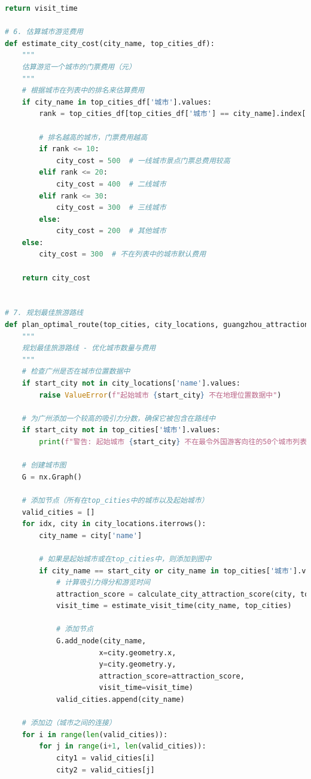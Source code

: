 \documentclass[withoutpreface,bwprint]{cumcmthesis} %
\begin{document}
\begin{appendices}
\begin{lstlisting}[language=python]
    return visit_time

# 6. 估算城市游览费用
def estimate_city_cost(city_name, top_cities_df):
    """
    估算游览一个城市的门票费用（元）
    """
    # 根据城市在列表中的排名来估算费用
    if city_name in top_cities_df['城市'].values:
        rank = top_cities_df[top_cities_df['城市'] == city_name].index[0] + 1
        
        # 排名越高的城市，门票费用越高
        if rank <= 10:
            city_cost = 500  # 一线城市景点门票总费用较高
        elif rank <= 20:
            city_cost = 400  # 二线城市
        elif rank <= 30:
            city_cost = 300  # 三线城市
        else:
            city_cost = 200  # 其他城市
    else:
        city_cost = 300  # 不在列表中的城市默认费用
    
    return city_cost


# 7. 规划最佳旅游路线
def plan_optimal_route(top_cities, city_locations, guangzhou_attractions=None, start_city="广州", max_hours=144):
    """
    规划最佳旅游路线 - 优化城市数量与费用
    """
    # 检查广州是否在城市位置数据中
    if start_city not in city_locations['name'].values:
        raise ValueError(f"起始城市 {start_city} 不在地理位置数据中")
    
    # 为广州添加一个较高的吸引力分数，确保它被包含在路线中
    if start_city not in top_cities['城市'].values:
        print(f"警告: 起始城市 {start_city} 不在最令外国游客向往的50个城市列表中")
    
    # 创建城市图
    G = nx.Graph()
    
    # 添加节点（所有在top_cities中的城市以及起始城市）
    valid_cities = []
    for idx, city in city_locations.iterrows():
        city_name = city['name']
        
        # 如果是起始城市或在top_cities中，则添加到图中
        if city_name == start_city or city_name in top_cities['城市'].values:
            # 计算吸引力得分和游览时间
            attraction_score = calculate_city_attraction_score(city, top_cities)
            visit_time = estimate_visit_time(city_name, top_cities)
            
            # 添加节点
            G.add_node(city_name, 
                      x=city.geometry.x, 
                      y=city.geometry.y, 
                      attraction_score=attraction_score,
                      visit_time=visit_time)
            valid_cities.append(city_name)
    
    # 添加边（城市之间的连接）
    for i in range(len(valid_cities)):
        for j in range(i+1, len(valid_cities)):
            city1 = valid_cities[i]
            city2 = valid_cities[j]
            

\end{lstlisting}
\end{appendices}
\end{document}
